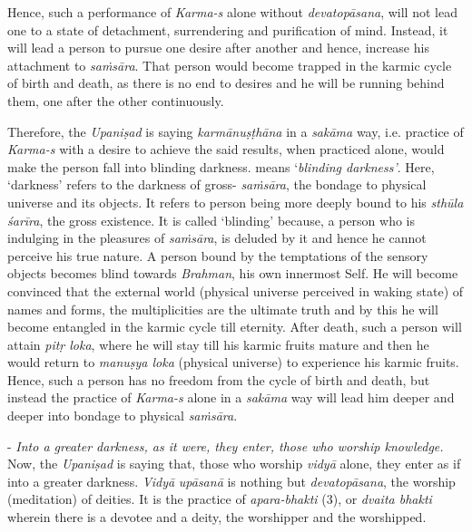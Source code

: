 Hence, such a performance of \emph{Karma-s} alone without \emph{devatopāsana}, will not lead one to a state of detachment, surrendering and purification of mind. Instead, it will lead a person to pursue one desire after another and hence, increase his attachment to \emph{saṁsāra}. That person would become trapped in the karmic cycle of birth and death, as there is no end to desires and he will be running behind them, one after the other continuously.

Therefore, the \emph{Upaniṣad} is saying \emph{karmānuṣṭhāna} in a \emph{sakāma} way, i.e. practice of \emph{Karma-s} with a desire to achieve the said results, when practiced alone, would make the person fall into blinding darkness.  means `\emph{blinding darkness'}. Here, `darkness' refers to the darkness of gross- \emph{saṁsāra}, the bondage to physical universe and its objects. It refers to person being more deeply bound to his \emph{sthūla śarīra}, the gross existence. It is called `blinding' because, a person who is indulging in the pleasures of \emph{saṁsāra}, is deluded by it and hence he cannot perceive his true nature. A person bound by the temptations of the sensory objects becomes blind towards \emph{Brahman}, his own innermost Self. He will become convinced that the external world (physical universe perceived in waking state) of names and forms, the multiplicities are the ultimate truth and by this he will become entangled in the karmic cycle till eternity. After death, such a person will attain \emph{pitṛ loka}, where he will stay till his karmic fruits mature and then he would return to \emph{manuṣya loka} (physical universe) to experience his karmic fruits. Hence, such a person has no freedom from the cycle of birth and death, but instead the practice of \emph{Karma-s} alone in a \emph{sakāma} way will lead him deeper and deeper into bondage to physical \emph{saṁsāra}.

- \emph{Into a greater darkness, as it were, they enter, those who worship knowledge.} Now, the \emph{Upaniṣad} is saying that, those who worship \emph{vidyā} alone, they enter as if into a greater darkness. \emph{Vidyā} \emph{upāsanā} is nothing but \emph{devatopāsana}, the worship (meditation) of deities. It is the practice of \emph{apara-bhakti} (3), or \emph{dvaita bhakti} wherein there is a devotee and a deity, the worshipper and the worshipped.

